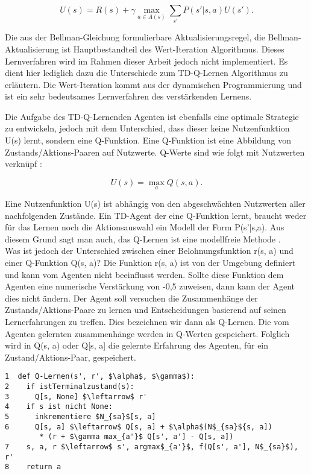 \begin{equation}
U(s) = R(s) + \gamma \max_{a \in A(s)} \sum_{s'} P(s'|s, a) U(s').
\end{equation}

Die aus der Bellman-Gleichung formulierbare Aktualisierungsregel, die Bellman-Aktualisierung ist Hauptbestandteil des Wert-Iteration Algorithmus. Dieses Lernverfahren wird im Rahmen dieser Arbeit jedoch nicht implementiert. Es dient hier lediglich dazu die Unterschiede zum TD-Q-Lernen Algorithmus zu erläutern. Die Wert-Iteration kommt aus der dynamischen Programmierung und ist ein sehr bedeutsames Lernverfahren des verstärkenden Lernens.

Die Aufgabe des TD-Q-Lernenden Agenten ist ebenfalls eine optimale Strategie zu entwickeln, jedoch mit dem Unterschied, dass dieser keine Nutzenfunktion U(s) lernt, sondern eine Q-Funktion. Eine Q-Funktion ist eine Abbildung von Zustands/Aktions-Paaren auf Nutzwerte. Q-Werte sind wie folgt mit Nutzwerten verknüpf \cite[973]{Russell}:

\begin{equation}
U(s) = \max_a Q(s,a).
\end{equation}

Eine Nutzenfunktion U(s) ist abhängig von den abgeschwächten Nutzwerten aller nachfolgenden Zustände. Ein TD-Agent der eine Q-Funktion lernt, braucht weder für das Lernen noch die Aktionsauswahl ein Modell der Form P(s'|s,a). Aus diesem Grund sagt man auch, das Q-Lernen ist eine modellfreie Methode \cite[974]{Russell}. \\

Was ist jedoch der Unterschied zwischen einer Belohnungsfunktion r(s, a) und einer Q-Funktion Q(s, a)? Die Funktion r(s, a) ist von der Umgebung definiert und kann vom Agenten nicht beeinflusst werden. Sollte diese Funktion dem Agenten eine numerische Verstärkung von -0,5 zuweisen, dann kann der Agent dies nicht ändern. Der Agent soll versuchen die Zusammenhänge der Zustands/Aktions-Paare zu lernen und Entscheidungen basierend auf seinen Lernerfahrungen zu treffen. Dies bezeichnen wir dann als Q-Lernen. Die vom Agenten gelernten zusammenhänge werden in Q-Werten gespeichert. Folglich wird in Q(s, a) oder Q[s, a] die gelernte Erfahrung des Agenten, für ein Zustand/Aktions-Paar, gespeichert. \\

\begin{lstlisting}[caption=TD-Q-Lernen Algorithmus, captionpos=b, label=lst:TD-Q-Lernen Algorithmus, frame=single, mathescape=true]
1  def Q-Lernen(s', r', $\alpha$, $\gamma$):
2    if istTerminalzustand(s):
3      Q[s, None] $\leftarrow$ r'
4    if s ist nicht None:
5      inkrementiere $N_{sa}$[s, a]
6      Q[s, a] $\leftarrow$ Q[s, a] + $\alpha$(N$_{sa}${s, a])
  		* (r + $\gamma max_{a'}$ Q[s', a'] - Q[s, a])
7    s, a, r $\leftarrow$ s', argmax$_{a'}$, f(Q[s', a'], N$_{sa}$), r'
8    return a
\end{lstlisting}

